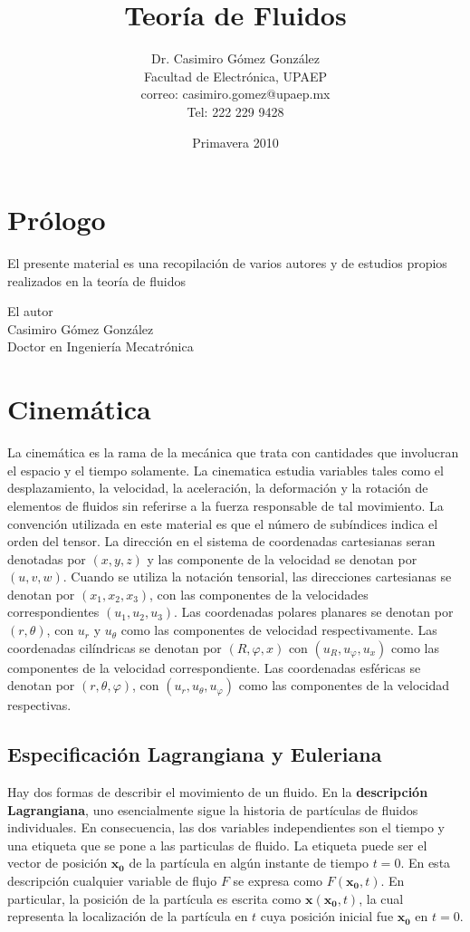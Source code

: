 \documentclass[12pt]{book}
\title{Teoría de Fluidos}
\author{Dr. Casimiro Gómez González\\
	Facultad de Electrónica, UPAEP\\
               correo: casimiro.gomez@upaep.mx\\
               Tel: 222 229 9428}
\date{Primavera 2010}
\theoremstyle{definition}
\theoremstyle{remark}
\theoremstyle{plain}
\begin{document}
\frontmatter
\maketitle


\chapter{Prólogo}

El presente material es una recopilación de varios autores y de estudios propios realizados en la teoría de fluidos


\begin{flushright}

El autor\\
Casimiro Gómez González\\
Doctor en Ingeniería Mecatrónica
\end{flushright}

\tableofcontents

\mainmatter
\chapter{Cinemática}
La cinemática es la rama de la mecánica que trata con cantidades que involucran el espacio y el tiempo solamente. La cinematica estudia variables tales como el desplazamiento, la velocidad, la aceleración, la deformación y la rotación de elementos de fluidos sin referirse a la fuerza responsable de tal movimiento. 
La convención utilizada en este material es que el número de subíndices indica el orden del tensor. La dirección en el sistema de coordenadas cartesianas seran denotadas por $(x,y,z)$ y las componente de la velocidad se denotan por $(u,v,w)$. Cuando se utiliza la notación tensorial, las direcciones cartesianas se denotan por $(x_1, x_2, x_3)$, con las componentes de la  velocidades correspondientes $(u_1, u_2, u_3)$. Las coordenadas polares planares se denotan por $(r, \theta)$, con $u_r$ y $u_\theta$ como las componentes de velocidad respectivamente. Las coordenadas cilíndricas se denotan por $(R, \varphi, x)$ con $(u_R, u_\varphi , u_x)$ como las componentes de la velocidad correspondiente. Las coordenadas esféricas se denotan por $(r, \theta, \varphi)$, con $(u_r, u_\theta, u_\varphi)$ como las componentes de la velocidad respectivas.

\section{Especificación Lagrangiana y Euleriana}
Hay dos formas de describir el movimiento de un fluido. En la \textbf{descripción Lagrangiana}, uno esencialmente sigue la historia de partículas de fluidos  individuales. En consecuencia, las dos variables independientes son el tiempo y una etiqueta que se pone a las particulas de fluido. La etiqueta puede ser el vector de posición $\mathbf{x_0}$ de la partícula en algún instante de tiempo $t=0$. En esta descripción cualquier variable de flujo $F$ se expresa como $F(\mathbf{x_0}, t)$. En particular, la posición de la partícula es escrita como $\mathbf{x}(\mathbf{x_0}, t)$, la cual representa la localización de la partícula en $t$ cuya posición inicial fue $\mathbf{x_0}$ en $t=0$.
\end{document}
